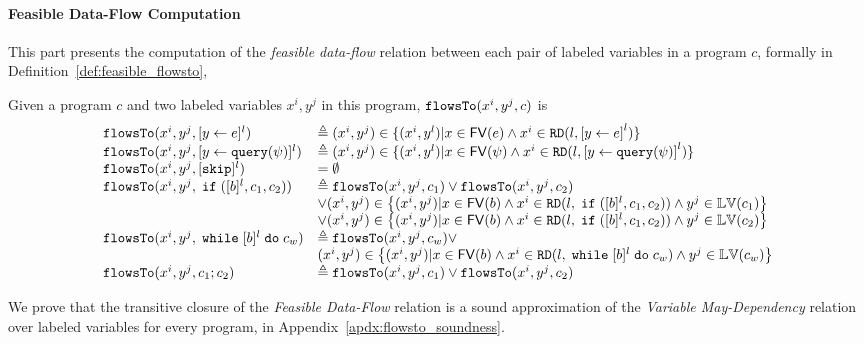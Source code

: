\paragraph{Feasible Data-Flow Computation}
This part presents the computation of the \emph{feasible data-flow} relation between each pair of labeled variables in a program $c$,
formally in Definition~\ref{def:feasible_flowsto}, 
%
%
\begin{defn}
  \label{def:feasible_flowsto}
  Given a program $c$ and two labeled variables $x^i, y^j$  in this program, 
  $\mathtt{flowsTo}(x^i, y^j, c)$ is 
    {\small
    \[
   \begin{array}{ll}
    \flowsto(x^i, y^j, \clabel{\assign{y}{\expr}}{}^l)  & \triangleq (x^i, y^j) \in \{ (x^i, y^l) | x \in \mathsf{FV}(\expr) 
    \land x^i \in \live(l, \clabel{\assign{y}{\expr}}^l) \}  \\
    \flowsto(x^i, y^j, \clabel{\assign{y}{\query(\qexpr)}}{}^l)  & \triangleq (x^i, y^j) \in \{ (x^i, y^l) | x \in \mathsf{FV}(\qexpr) 
    \land x^i \in \live(l,\clabel{\assign{y}{\query(\qexpr)}}^l) \}  \\
    \flowsto(x^i, y^j, [\eskip]^{l})  & = \emptyset \\
    \flowsto(x^i, y^j, \eif ([b]^l, c_1, c_2))  & \triangleq \flowsto(x^i, y^j, c_1) \lor \flowsto(x^i, y^j, c_2) \\ 
        & \lor (x^i, y^j) \in
        \left\{(x^i,y^j) | x \in \mathsf{FV}(b) \land 
      x^i \in \live(l, \eif ([b]^l, c_1, c_2)) \land  y^j \in \lvar(c_1) \right\} \\
       &\lor (x^i, y^j) \in \left\{(x^i,y^j) | x \in \mathsf{FV}(b) \land 
      x^i\in \live(l, \eif ([b]^l, c_1, c_2))  \land  y^j \in \lvar(c_2)  \right\} \\
       \flowsto(x^i, y^j, \ewhile [b]^l \edo c_w)  & \triangleq  \flowsto(x^i, y^j, c_w)  \lor
       \\ & 
       (x^i, y^j) \in  \left\{(x^i,y^j) | x \in \mathsf{FV}(b) \land 
      x^i \in \live(l,   \ewhile [b]^l \edo c_w) \land  y^j \in \lvar(c_w) \right\} \\
       \flowsto(x^i, y^j, c_1 ;c_2)  & \triangleq \flowsto(x^i, y^j, c_1) \lor \flowsto(x^i, y^j, c_2) \\
   \end{array}
   \]
   }
   \end{defn}
%
We prove that the transitive closure of the \emph{Feasible Data-Flow} relation is a sound approximation 
of the \emph{Variable May-Dependency} relation over labeled variables for every program,
in Appendix~\ref{apdx:flowsto_soundness}.
%

